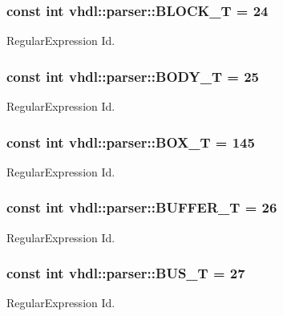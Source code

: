 \subsubsection[{B\+L\+O\+C\+K\+\_\+\+T}]{\setlength{\rightskip}{0pt plus 5cm}const int vhdl\+::parser\+::\+B\+L\+O\+C\+K\+\_\+\+T = 24}\label{namespacevhdl_1_1parser_a1e845b0d4903c59d5b8e996a5d03cd2a}
Regular\+Expression Id. \hypertarget{namespacevhdl_1_1parser_a263009b1934ea56406599c92d4bfe452}{}
\subsubsection[{B\+O\+D\+Y\+\_\+\+T}]{\setlength{\rightskip}{0pt plus 5cm}const int vhdl\+::parser\+::\+B\+O\+D\+Y\+\_\+\+T = 25}\label{namespacevhdl_1_1parser_a263009b1934ea56406599c92d4bfe452}
Regular\+Expression Id. \hypertarget{namespacevhdl_1_1parser_aedc706ccc68b14cad54d3081cf1eba35}{}
\subsubsection[{B\+O\+X\+\_\+\+T}]{\setlength{\rightskip}{0pt plus 5cm}const int vhdl\+::parser\+::\+B\+O\+X\+\_\+\+T = 145}\label{namespacevhdl_1_1parser_aedc706ccc68b14cad54d3081cf1eba35}
Regular\+Expression Id. \hypertarget{namespacevhdl_1_1parser_a55717014df79dc296c701ab9e850a127}{}
\subsubsection[{B\+U\+F\+F\+E\+R\+\_\+\+T}]{\setlength{\rightskip}{0pt plus 5cm}const int vhdl\+::parser\+::\+B\+U\+F\+F\+E\+R\+\_\+\+T = 26}\label{namespacevhdl_1_1parser_a55717014df79dc296c701ab9e850a127}
Regular\+Expression Id. \hypertarget{namespacevhdl_1_1parser_a230b4083e6e82f73c8141b82a841a065}{}
\subsubsection[{B\+U\+S\+\_\+\+T}]{\setlength{\rightskip}{0pt plus 5cm}const int vhdl\+::parser\+::\+B\+U\+S\+\_\+\+T = 27}\label{namespacevhdl_1_1parser_a230b4083e6e82f73c8141b82a841a065}
Regular\+Expression Id. \hypertarget{namespacevhdl_1_1parser_ae07e8aa6d70c9db2046bd3fc972aa63c}{}
